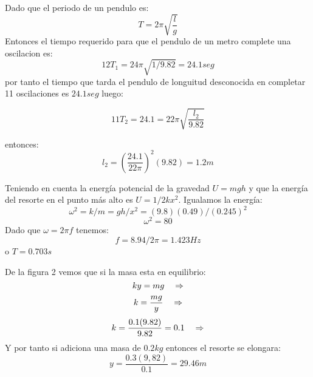 \documentclass[a4paper]{article}
\begin{document}
    \begin{answer}[Problema 7.]
    
        Dado que el periodo de un pendulo es: 
        \begin{equation*}
            T = 2\pi \sqrt{\frac{l}{g}}
        \end{equation*}
        Entonces el tiempo requerido para que el pendulo de un metro complete una oscilacion es:
        $$12 T_1 = 24\pi\sqrt{1/9.82} = 24.1seg$$
        por tanto el tiempo que tarda el pendulo de longuitud desconocida en completar 11 oscilaciones es $24.1seg$ luego:
        
       $$11 T_2 = 24.1 = 22\pi \sqrt{\frac{l_2}{9.82}}$$
       
       entonces: 
       $$l_2 = \left(\frac{24.1}{22\pi}\right)^2(9.82) = 1.2 m$$
    \end{answer}
    
    \begin{answer}[8.]
    Teniendo en cuenta la energía potencial de la gravedad $U = mgh$ y que la energía del resorte en el punto más alto es $U = 1/2 kx^2$. Igualamos la energía:
    $$\omega^2 = k/m = gh/x^2 = (9.8)(0.49)/(0.245)^2$$
    $$ \omega^2 = 80 $$
    Dado que $\omega = 2\pi f$ tenemos:
    $$ f = 8.94/2\pi = 1.423 Hz$$
    o $T =  0.703 s$
    
    \end{answer}
    
    \begin{answer}[Problema 9.]
    De la figura 2 vemos que si la masa esta en equilibrio:
    $$ky = mg\hspace{0.35cm}\Rightarrow$$
    $$k = \frac{mg}{y}\hspace{0.35cm}\Rightarrow$$
    $$k = \frac{0.1(9.82) }{9.82} = 0.1\hspace{0.35cm}\Rightarrow$$
    Y por tanto si adiciona una masa de $0.2kg$
    entonces el resorte se elongara:
    $$y = \frac{0.3(9,82)}{0.1} = 29.46m$$
    \end{answer}
    
    \begin{answer}[10).]
    
    \end{answer}
\end{document}
